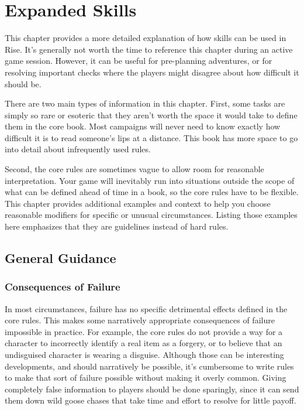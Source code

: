 \chapter{Expanded Skills}

This chapter provides a more detailed explanation of how skills can be used in Rise.
It's generally not worth the time to reference this chapter during an active game session.
However, it can be useful for pre-planning adventures, or for resolving important checks where the players might disagree about how difficult it should be.

There are two main types of information in this chapter.
First, some tasks are simply so rare or esoteric that they aren't worth the space it would take to define them in the core book.
Most campaigns will never need to know exactly how difficult it is to read someone's lips at a distance.
This book has more space to go into detail about infrequently used rules.

Second, the core rules are sometimes vague to allow room for reasonable interpretation.
Your game will inevitably run into situations outside the scope of what can be defined ahead of time in a book, so the core rules have to be flexible.
This chapter provides additional examples and context to help you choose reasonable modifiers for specific or unusual circumstances.
Listing those examples here emphasizes that they are guidelines instead of hard rules.

\section{General Guidance}

    \subsection{Consequences of Failure}
        In most circumstances, failure has no specific detrimental effects defined in the core rules.
        This makes some narratively appropriate consequences of failure impossible in practice.
        For example, the core rules do not provide a way for a character to incorrectly identify a real item as a forgery, or to believe that an undisguised character is wearing a disguise.
        Although those can be interesting developments, and should narratively be possible, it's cumbersome to write rules to make that sort of failure possible without making it overly common.
        Giving completely false information to players should be done sparingly, since it can send them down wild goose chases that take time and effort to resolve for little payoff.

